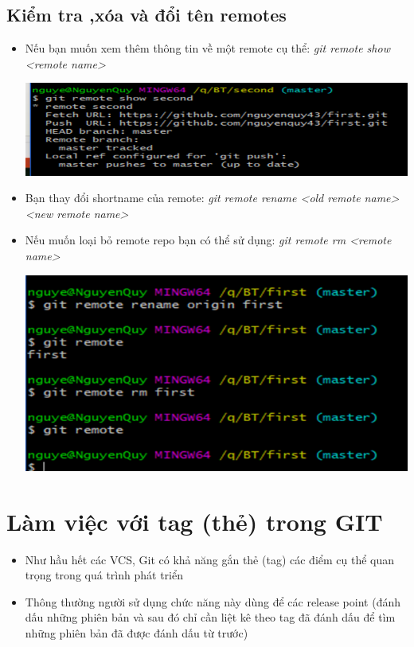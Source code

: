 \documentclass[12pt,a4paper]{report}
\begin{document}
\subsection{Kiểm tra ,xóa và đổi tên remotes} 
\begin{itemize}
\item Nếu bạn muốn xem thêm thông tin về một remote cụ thể: {\it git remote show <remote name>}

	\includegraphics[width=0.8\linewidth]{screenshot040}

	\label{fig:screenshot040}

\item Bạn thay đổi shortname của remote: {\it git remote rename <old remote name> <new remote name>}
\item Nếu muốn loại bỏ remote repo  bạn có thể sử dụng: {\it git remote rm <remote name> }


	\includegraphics[width=0.8\linewidth]{screenshot041}

	\label{fig:screenshot041}
\end{itemize}

			
\section{Làm việc với tag (thẻ) trong GIT}
\begin{itemize}
\item Như hầu hết các VCS, Git có khả năng gắn thẻ (tag) các điểm cụ thể quan trọng trong quá trình phát triển
\item Thông thường người sử dụng chức năng này dùng để các release point (đánh dấu những phiên bản và sau đó chỉ cần liệt kê theo tag đã đánh dấu để tìm những phiên bản đã được đánh dấu từ trước)
\end{itemize}
\end{document}
